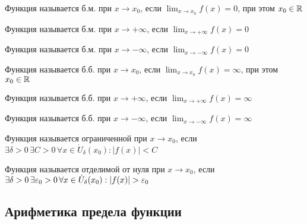 {
    Функция называется б.м. при $x \to x_0$, если $\lim_{x \to x_0} f(x) = 0$, при этом $ x_0 \in \Rset $

    Функция называется б.м. при $x \to +\infty$, если $\lim_{x \to +\infty} f(x) = 0$

    Функция называется б.м. при $x \to -\infty$, если $\lim_{x \to -\infty} f(x) = 0$
}

{
    Функция называется б.б. при $x \to x_0$, если $\lim_{x \to x_0} f(x) = \infty $, при этом $ x_0 \in \Rset $

    Функция называется б.б. при $x \to +\infty$, если $\lim_{x \to +\infty} f(x) = \infty $

    Функция называется б.б. при $x \to -\infty$, если $\lim_{x \to -\infty} f(x) = \infty $
}

{
    Функция называется ограниченной при $x \to x_0$, если $\exists \delta > 0 \, \exists C > 0 \, \forall x \in \dot{U}_\delta(x_0): | f(x) | < C $
}

{
    Функция называется отделимой от нуля при $x \to x_0$, если 
    $\exists \delta > 0 \, \exists \varepsilon_0 > 0 \, \forall x \in \dot{U}_\delta(x_0): | f(x) | > \varepsilon_0 $ 
}



\subsection{Арифметика предела функции}

